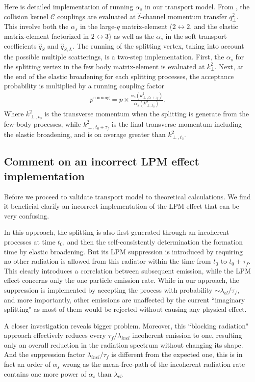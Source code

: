 Here is detailed implementation of running $\alpha_s$ in our transport model. 
From \cite{Arnold:2008zu}, the collision kernel $\mathcal{C}$ couplings are evaluated at $\hat{t}$-channel momentum transfer $q_\perp^2$.
This involve both the $\alpha_s$ in the large-$q$ matrix-element ($2\leftrightarrow 2$, and the elastic matrix-element factorized in $2\leftrightarrow 3$) as well as the $\alpha_s$ in the soft transport coefficients $\hat{q}_S$ and $\hat{q}_{S, L}$.
The running of the splitting vertex, taking into account the possible multiple scatterings, is a two-step implementation. 
First, the $\alpha_s$ for the splitting vertex in the few body matrix-element is evaluated at $k_\perp^2$.
Next, at the end of the elastic broadening for each splitting processes, the acceptance probability is multiplied by a running coupling factor
\begin{eqnarray}
p^{\textrm{running}} = p\times \frac{\alpha_s(k_{\perp,t_0+\tau_f}^2)}{\alpha_s(k_{\perp,t_0}^2)}.
\end{eqnarray}
Where $k_{\perp,t_0}^2$ is the transverse momentum when the splitting is generate from the few-body processes, while $k_{\perp,t_0+\tau_f}^2$ is the final transverse momentum including the elastic broadening, and is on average greater than $k_{\perp,t_0}^2$.

\subsection{Comment on an incorrect LPM effect implementation}
Before we proceed to validate transport model to theoretical calculations.
We find it beneficial clarify an incorrect implementation of the LPM effect that can be very confusing. 

In this approach, the splitting is also first generated through an incoherent processes at time $t_0$, and then the self-consistently determination the formation time by elastic broadening. 
But its LPM suppression is introduced by requiring no other radiation is allowed from this radiator within the time from $t_0$ to $t_0 + \tau_f$.
This clearly introduces a correlation between subsequent emission, while the LPM effect concerns only the one particle emission rate.
While in our approach, the suppression is implemented by accepting the process with probability $\sim \lambda_{el}/\tau_f$, and more importantly, other emissions are unaffected by the current ``imaginary splitting" as most of them would be rejected without causing any physical effect.

A closer investigation reveals bigger problem.
Moreover, this ``blocking radiation" approach effectively reduces every $\tau_f/\lambda_{inel}$ incoherent emission to one, resulting only an overall reduction in the radiation spectrum without changing its shape.
And the suppression factor $\lambda_{inel}/\tau_f$ is different from the expected one, this is in fact an order of $\alpha_s$ wrong as the mean-free-path of the incoherent radiation rate contains one more power of $\alpha_s$ than $\lambda_{el}$.


